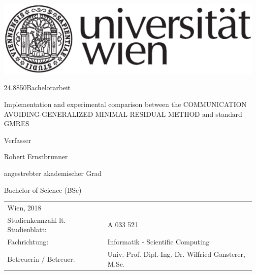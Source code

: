 \documentclass{scrartcl}
\makeatletter
\newcommand\HUGE{\@setfontsize\Huge{24.88}{50}}
\makeatother
\begin{document}

 
\thispagestyle{empty}
\begin{center}
\begin{minipage}{.9\linewidth}
\flushright
	      		 
    \includegraphics[width=0.5\linewidth]{univie.eps}\par
\centering 	
	{\scshape{\HUGE Bachelorarbeit\par}}
	\vspace{1cm}
    {\scshape{\Large Implementation and experimental comparison between the COMMUNICATION AVOIDING-GENERALIZED MINIMAL RESIDUAL METHOD and standard GMRES \par}}
    \vspace{2cm}
    
  
 Verfasser  \linebreak
 {\Large Robert Ernstbrunner \par}
 	\vspace{.7cm}
angestrebter akademischer Grad\linebreak
 {\Large Bachelor of Science (BSc)\par}
	\vspace{.7cm}

\flushleft
	

\begin{tabular}{ll}
Wien, 2018	\linebreak
\vspace{.5cm}&   \\
  Studienkennzahl lt. Studienblatt: & A 033 521 \vspace{.3cm} \\ 
  Fachrichtung: & Informatik  - Scientific Computing
  \vspace{.3cm} \\
  Betreuerin / Betreuer: & Univ.-Prof. Dipl.-Ing. Dr. Wilfried Gansterer, M.Sc. \\
 \end{tabular}
 

\end{minipage}
\end{center}
\clearpage

\pagebreak
\end{document}
